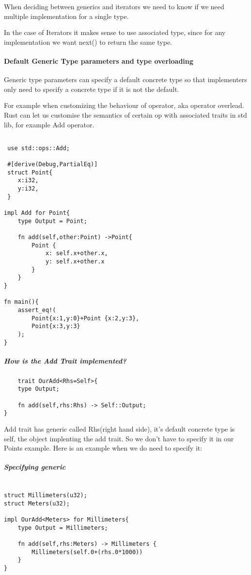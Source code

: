 When deciding between generics and iterators we need to know if we need multiple implementation for a single type. 

In the case of Iterators it makes sense to use associated type, since for any implementation we want next() to return the same type.


\paragraph*{Default Generic Type parameters and type overloading}

Generic type parameters can specify a default concrete type so that implementers only need to specify a concrete type if it is not the default.

For example when customizing the behaviour of operator, aka operator overlead. Rust can let us customise the semantics of certain op with associated traits in std lib, for example Add operator.
\begin{lstlisting}
    
 use std::ops::Add;

 #[derive(Debug,PartialEq)]
 struct Point{
    x:i32,
    y:i32,
 }

impl Add for Point{
    type Output = Point;
    
    fn add(self,other:Point) ->Point{
        Point { 
            x: self.x+other.x, 
            y: self.x+other.x 
        } 
    }
}

fn main(){
    assert_eq!(
        Point{x:1,y:0}+Point {x:2,y:3},
        Point{x:3,y:3}
    );
}
\end{lstlisting}

\subparagraph*{How is the Add Trait implemented?}\begin{lstlisting}
    trait OurAdd<Rhs=Self>{  
    type Output;

    fn add(self,rhs:Rhs) -> Self::Output;
}
\end{lstlisting}
Add trait has generic called Rhs(right hand side), it's default concrete type is self, the object implenting the add trait. So we don't have to specify it in our Points example. Here is an example when we do need to specify it:

\subparagraph*{Specifying generic}\begin{lstlisting}
    
struct Millimeters(u32);
struct Meters(u32);

impl OurAdd<Meters> for Millimeters{
    type Output = Millimeters;

    fn add(self,rhs:Meters) -> Millimeters {
        Millimeters(self.0+(rhs.0*1000))
    }
}
\end{lstlisting}

